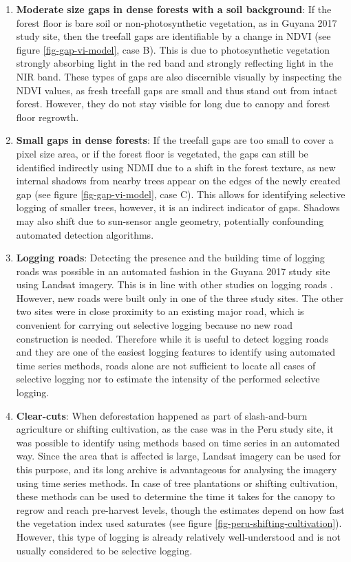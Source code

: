 \documentclass[a4paper,12pt]{scrbook}
\begin{document}
\begin{enumerate}
 \item \textbf{Moderate size gaps in dense forests with a soil background}: If the forest floor is bare soil or non-photosynthetic vegetation, as in Guyana 2017 study site, then the treefall gaps are identifiable by a change in \ac{NDVI} (see figure \ref{fig-gap-vi-model}, case B). This is due to photosynthetic vegetation strongly absorbing light in the red band and strongly reflecting light in the \ac{NIR} band. These types of gaps are also discernible visually by inspecting the \ac{NDVI} values, as fresh treefall gaps are small and thus stand out from intact forest. However, they do not stay visible for long due to canopy and forest floor regrowth.
 \item \textbf{Small gaps in dense forests}: If the treefall gaps are too small to cover a pixel size area, or if the forest floor is vegetated, the gaps can still be identified indirectly using \ac{NDMI} due to a shift in the forest texture, as new internal shadows from nearby trees appear on the edges of the newly created gap (see figure \ref{fig-gap-vi-model}, case C). This allows for identifying selective logging of smaller trees, however, it is an indirect indicator of gaps. Shadows may also shift due to sun-sensor angle geometry, potentially confounding automated detection algorithms.
 \item \textbf{Logging roads}: Detecting the presence and the building time of logging roads was possible in an automated fashion in the Guyana 2017 study site using Landsat imagery. This is in line with other studies on logging roads \citep{kleinschroth_how_2016}. However, new roads were built only in one of the three study sites. The other two sites were in close proximity to an existing major road, which is convenient for carrying out selective logging because no new road construction is needed. Therefore while it is useful to detect logging roads and they are one of the easiest logging features to identify using automated time series methods, roads alone are not sufficient to locate all cases of selective logging nor to estimate the intensity of the performed selective logging.
 \item \textbf{Clear-cuts}: When deforestation happened as part of slash-and-burn agriculture or shifting cultivation, as the case was in the Peru study site, it was possible to identify using methods based on time series in an automated way. Since the area that is affected is large, Landsat imagery can be used for this purpose, and its long archive is advantageous for analysing the imagery using time series methods. In case of tree plantations or shifting cultivation, these methods can be used to determine the time it takes for the canopy to regrow and reach pre-harvest levels, though the estimates depend on how fast the vegetation index used saturates (see figure \ref{fig-peru-shifting-cultivation}). However, this type of logging is already relatively well-understood and is not usually considered to be selective logging.
\end{enumerate}
\end{document}
